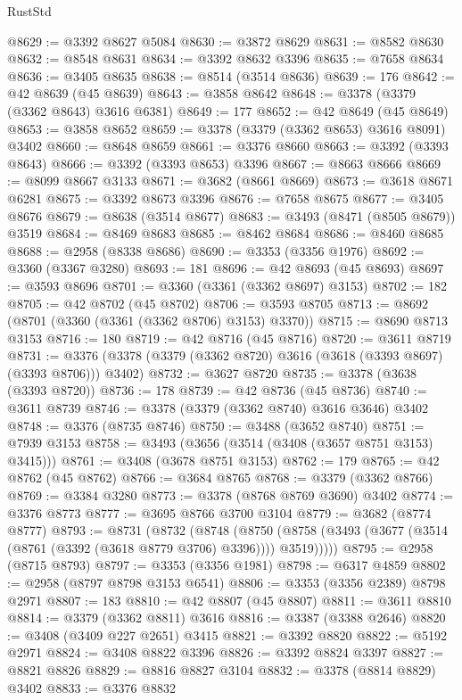 \begin{lexlean}{RustStd}
\begin{coremodule}
@8629 := @3392 @8627 @5084
@8630 := @3872 @8629
@8631 := @8582 @8630
@8632 := @8548 @8631
@8634 := @3392 @8632 @3396
@8635 := @7658 @8634
@8636 := @3405 @8635
@8638 := @8514 (@3514 @8636)
@8639 := 176
@8642 := @42 @8639 (@45 @8639)
@8643 := @3858 @8642
@8648 := @3378 (@3379 (@3362 @8643) @3616 @6381)
@8649 := 177
@8652 := @42 @8649 (@45 @8649)
@8653 := @3858 @8652
@8659 := @3378 (@3379 (@3362 @8653) @3616 @8091) @3402
@8660 := @8648 @8659
@8661 := @3376 @8660
@8663 := @3392 (@3393 @8643)
@8666 := @3392 (@3393 @8653) @3396
@8667 := @8663 @8666
@8669 := @8099 @8667 @3133
@8671 := @3682 (@8661 @8669)
@8673 := @3618 @8671 @6281
@8675 := @3392 @8673 @3396
@8676 := @7658 @8675
@8677 := @3405 @8676
@8679 := @8638 (@3514 @8677)
@8683 := @3493 (@8471 (@8505 @8679)) @3519
@8684 := @8469 @8683
@8685 := @8462 @8684
@8686 := @8460 @8685
@8688 := @2958 (@8338 @8686)
@8690 := @3353 (@3356 @1976)
@8692 := @3360 (@3367 @3280)
@8693 := 181
@8696 := @42 @8693 (@45 @8693)
@8697 := @3593 @8696
@8701 := @3360 (@3361 (@3362 @8697) @3153)
@8702 := 182
@8705 := @42 @8702 (@45 @8702)
@8706 := @3593 @8705
@8713 := @8692 (@8701 (@3360 (@3361 (@3362 @8706) @3153) @3370))
@8715 := @8690 @8713 @3153
@8716 := 180
@8719 := @42 @8716 (@45 @8716)
@8720 := @3611 @8719
@8731 := @3376 (@3378 (@3379 (@3362 @8720) @3616 (@3618 (@3393 @8697) (@3393 @8706))) @3402)
@8732 := @3627 @8720
@8735 := @3378 (@3638 (@3393 @8720))
@8736 := 178
@8739 := @42 @8736 (@45 @8736)
@8740 := @3611 @8739
@8746 := @3378 (@3379 (@3362 @8740) @3616 @3646) @3402
@8748 := @3376 (@8735 @8746)
@8750 := @3488 (@3652 @8740)
@8751 := @7939 @3153
@8758 := @3493 (@3656 (@3514 (@3408 (@3657 @8751 @3153) @3415)))
@8761 := @3408 (@3678 @8751 @3153)
@8762 := 179
@8765 := @42 @8762 (@45 @8762)
@8766 := @3684 @8765
@8768 := @3379 (@3362 @8766)
@8769 := @3384 @3280
@8773 := @3378 (@8768 @8769 @3690) @3402
@8774 := @3376 @8773
@8777 := @3695 @8766 @3700 @3104
@8779 := @3682 (@8774 @8777)
@8793 := @8731
    (@8732
      (@8748
        (@8750 (@8758 (@3493 (@3677 (@3514 (@8761 (@3392 (@3618 @8779 @3706) @3396)))) @3519)))))
@8795 := @2958 (@8715 @8793)
@8797 := @3353 (@3356 @1981)
@8798 := @6317 @4859
@8802 := @2958 (@8797 @8798 @3153 @6541)
@8806 := @3353 (@3356 @2389) @8798 @2971
@8807 := 183
@8810 := @42 @8807 (@45 @8807)
@8811 := @3611 @8810
@8814 := @3379 (@3362 @8811) @3616
@8816 := @3387 (@3388 @2646)
@8820 := @3408 (@3409 @227 @2651) @3415
@8821 := @3392 @8820
@8822 := @5192 @2971
@8824 := @3408 @8822 @3396
@8826 := @3392 @8824 @3397
@8827 := @8821 @8826
@8829 := @8816 @8827 @3104
@8832 := @3378 (@8814 @8829) @3402
@8833 := @3376 @8832

\end{coremodule}
\end{lexlean}
